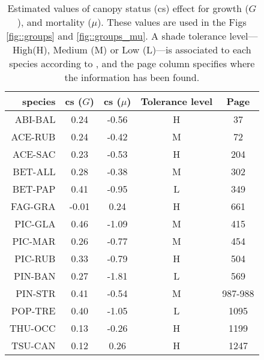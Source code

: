 \begin{refsection}
\begin{table}[h!]
\centering
\caption{Estimated values of canopy status (cs) effect for growth ($ G $), and mortality ($ \mu $). These values are used in the Figs \ref{fig::groups} and \ref{fig::groups_mu}. A shade tolerance level---High(H), Medium (M) or Low (L)---is associated to each species according to \citet{Burns1990, Burns1990a}, and the page column specifies where the information has been found. \label{tab::cs}}
\begin{tabular}{@{}rcccc@{}}
	\toprule
	\bfseries{species} & \bfseries{cs} ($ G $) & \bfseries{cs} ($ \mu $) & \bfseries{Tolerance level} & \bfseries{Page} \\
	\midrule
	ABI-BAL & 0.24 & -0.56 & H & 37 \\
	ACE-RUB & 0.24 & -0.42 & M & 72 \\
	ACE-SAC & 0.23 & -0.53 & H & 204 \\
	BET-ALL & 0.28 & -0.38 & M & 302 \\
	BET-PAP & 0.41 & -0.95 & L & 349 \\
	FAG-GRA & -0.01 & 0.24 & H & 661 \\
	PIC-GLA & 0.46 & -1.09 & M & 415 \\
	PIC-MAR & 0.26 & -0.77 & M & 454 \\
	PIC-RUB & 0.33 & -0.79 & H & 504 \\
	PIN-BAN & 0.27 & -1.81 & L & 569 \\
	PIN-STR & 0.41 & -0.54 & M & 987-988 \\
	POP-TRE & 0.40 & -1.05 & L & 1095 \\
	THU-OCC & 0.13 & -0.26 & H & 1199 \\
	TSU-CAN & 0.12 & 0.26 & H & 1247 \\
	\bottomrule
\end{tabular}
\end{table}


\end{refsection}
